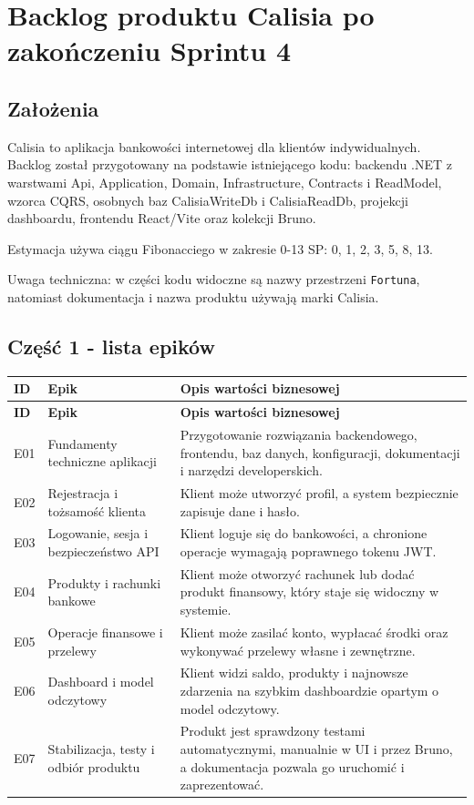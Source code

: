 \documentclass[12pt,a4paper]{article}
\begin{document}
\section*{Backlog produktu Calisia po zakończeniu Sprintu 4}

\subsection*{Założenia}

Calisia to aplikacja bankowości internetowej dla klientów indywidualnych. Backlog został przygotowany na podstawie istniejącego kodu: backendu .NET z warstwami Api, Application, Domain, Infrastructure, Contracts i ReadModel, wzorca CQRS, osobnych baz CalisiaWriteDb i CalisiaReadDb, projekcji dashboardu, frontendu React/Vite oraz kolekcji Bruno.

Estymacja używa ciągu Fibonacciego w zakresie 0-13 SP: 0, 1, 2, 3, 5, 8, 13.

Uwaga techniczna: w części kodu widoczne są nazwy przestrzeni \texttt{Fortuna}, natomiast dokumentacja i nazwa produktu używają marki Calisia.

\subsection*{Część 1 - lista epików}

\begingroup
\footnotesize
{}
\begin{longtable}{@{}L{0.10\textwidth}L{0.27\textwidth}L{0.57\textwidth}@{}}
\toprule
{}
\textbf{ID} & \textbf{Epik} & \textbf{Opis wartości biznesowej} \\
\midrule
\endfirsthead
\toprule
{}
\textbf{ID} & \textbf{Epik} & \textbf{Opis wartości biznesowej} \\
\midrule
\endhead
E01 & Fundamenty techniczne aplikacji & Przygotowanie rozwiązania backendowego, frontendu, baz danych, konfiguracji, dokumentacji i narzędzi developerskich. \\
E02 & Rejestracja i tożsamość klienta & Klient może utworzyć profil, a system bezpiecznie zapisuje dane i hasło. \\
E03 & Logowanie, sesja i bezpieczeństwo API & Klient loguje się do bankowości, a chronione operacje wymagają poprawnego tokenu JWT. \\
E04 & Produkty i rachunki bankowe & Klient może otworzyć rachunek lub dodać produkt finansowy, który staje się widoczny w systemie. \\
E05 & Operacje finansowe i przelewy & Klient może zasilać konto, wypłacać środki oraz wykonywać przelewy własne i zewnętrzne. \\
E06 & Dashboard i model odczytowy & Klient widzi saldo, produkty i najnowsze zdarzenia na szybkim dashboardzie opartym o model odczytowy. \\
E07 & Stabilizacja, testy i odbiór produktu & Produkt jest sprawdzony testami automatycznymi, manualnie w UI i przez Bruno, a dokumentacja pozwala go uruchomić i zaprezentować. \\
\bottomrule
\end{longtable}
\endgroup
\end{document}
